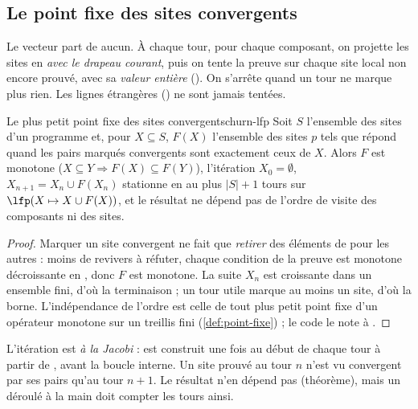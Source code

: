 \subsection{Le point fixe des sites convergents}


Le vecteur  part de \og aucun\fg. À chaque tour, pour chaque composant, on
projette les sites en  \emph{avec le drapeau courant}, puis on tente la preuve sur
chaque site local non encore prouvé, avec sa \emph{valeur entière} ().
On s'arrête quand un tour ne marque plus rien. Les lignes étrangères
() ne sont jamais tentées.

\begin{theoreme}{Le plus petit point fixe des sites convergents}{churn-lfp}
Soit $S$ l'ensemble des sites d'un programme et, pour $X \subseteq S$, $F(X)$ l'ensemble des
sites $p$ tels que  répond  quand les pairs
marqués convergents sont exactement ceux de $X$. Alors $F$ est monotone
($X \subseteq Y \Rightarrow F(X) \subseteq F(Y)$), l'itération $X_0 = \emptyset$,
$X_{n+1} = X_n \cup F(X_n)$ stationne en au plus $|S| + 1$ tours sur
$\lfp(X \mapsto X \cup F(X))$, et le résultat ne dépend pas de l'ordre de visite des
composants ni des sites.
\end{theoreme}
\begin{proof}
Marquer un site convergent ne fait que \emph{retirer} des éléments de 
pour les autres : moins de revivers à réfuter, chaque condition de la preuve est
monotone décroissante en , donc $F$ est monotone. La suite $X_n$ est croissante
dans un ensemble fini, d'où la terminaison ; un tour utile marque au moins un site, d'où la
borne. L'indépendance de l'ordre est celle de tout plus petit point fixe d'un opérateur
monotone sur un treillis fini (\cref{def:point-fixe}) ; le code le note à
.
\end{proof}

\begin{remarque}
L'itération est \emph{à la Jacobi} :  est construit une fois au début de chaque
tour à partir de , avant la boucle interne. Un site prouvé au tour $n$
n'est vu convergent par ses pairs qu'au tour $n+1$. Le résultat n'en dépend pas (théorème),
mais un déroulé à la main doit compter les tours ainsi.
\end{remarque}

